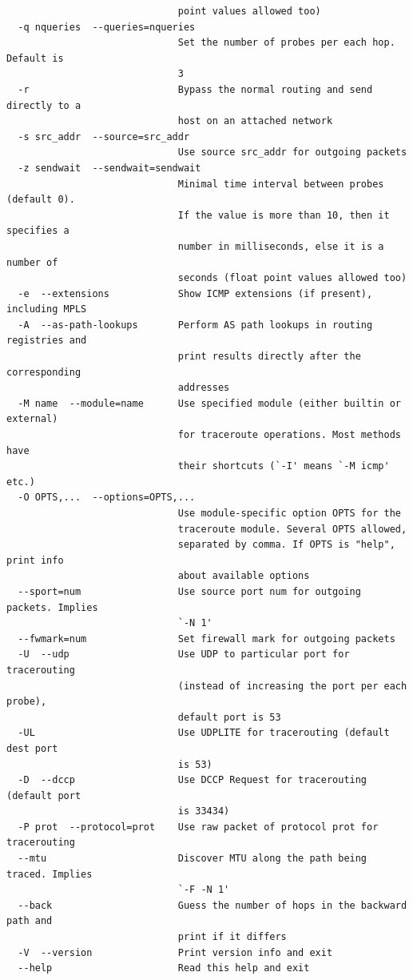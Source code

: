 \begin{verbatim}
                              point values allowed too)
  -q nqueries  --queries=nqueries
                              Set the number of probes per each hop. Default is
                              3
  -r                          Bypass the normal routing and send directly to a
                              host on an attached network
  -s src_addr  --source=src_addr
                              Use source src_addr for outgoing packets
  -z sendwait  --sendwait=sendwait
                              Minimal time interval between probes (default 0).
                              If the value is more than 10, then it specifies a
                              number in milliseconds, else it is a number of
                              seconds (float point values allowed too)
  -e  --extensions            Show ICMP extensions (if present), including MPLS
  -A  --as-path-lookups       Perform AS path lookups in routing registries and
                              print results directly after the corresponding
                              addresses
  -M name  --module=name      Use specified module (either builtin or external)
                              for traceroute operations. Most methods have
                              their shortcuts (`-I' means `-M icmp' etc.)
  -O OPTS,...  --options=OPTS,...
                              Use module-specific option OPTS for the
                              traceroute module. Several OPTS allowed,
                              separated by comma. If OPTS is "help", print info
                              about available options
  --sport=num                 Use source port num for outgoing packets. Implies
                              `-N 1'
  --fwmark=num                Set firewall mark for outgoing packets
  -U  --udp                   Use UDP to particular port for tracerouting
                              (instead of increasing the port per each probe),
                              default port is 53
  -UL                         Use UDPLITE for tracerouting (default dest port
                              is 53)
  -D  --dccp                  Use DCCP Request for tracerouting (default port
                              is 33434)
  -P prot  --protocol=prot    Use raw packet of protocol prot for tracerouting
  --mtu                       Discover MTU along the path being traced. Implies
                              `-F -N 1'
  --back                      Guess the number of hops in the backward path and
                              print if it differs
  -V  --version               Print version info and exit
  --help                      Read this help and exit


\end{verbatim}
